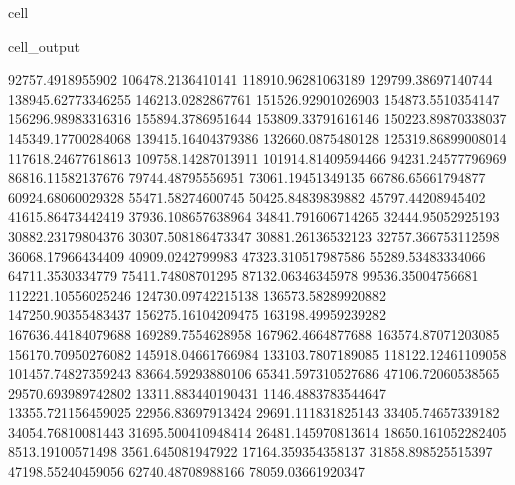 \documentclass[letterpaper,10pt,english]{jupyterBook}
\begin{document}
\begin{sphinxuseclass}{cell}
\begin{sphinxVerbatimOutput}
\begin{sphinxuseclass}{cell_output}
\begin{sphinxVerbatim}[commandchars=\\\{\}]
92757.4918955902  106478.2136410141  118910.96281063189  129799.38697140744  138945.62773346255  146213.0282867761  151526.92901026903  154873.5510354147  156296.98983316316  155894.3786951644  153809.33791616146  150223.89870338037  145349.17700284068  139415.16404379386  132660.0875480128  125319.86899008014  117618.24677618613  109758.14287013911  101914.81409594466  94231.24577796969  86816.11582137676  79744.48795556951  73061.19451349135  66786.65661794877  60924.68060029328  55471.58274600745  50425.84839839882  45797.44208945402  41615.86473442419  37936.108657638964  34841.791606714265  32444.95052925193  30882.23179804376  30307.508186473347  30881.26136532123  32757.366753112598  36068.17966434409  40909.0242799983  47323.310517987586  55289.53483334066  64711.3530334779  75411.74808701295  87132.06346345978  99536.35004756681  112221.10556025246  124730.09742215138  136573.58289920882  147250.90355483437  156275.16104209475  163198.49959239282  167636.44184079688  169289.7554628958  167962.4664877688  163574.87071203085  156170.70950276082  145918.04661766984  133103.7807189085  118122.12461109058  101457.74827359243  83664.59293880106  65341.597310527686  47106.72060538565  29570.693989742802  13311.883440190431  \PYGZhy{}1146.4883783544647  \PYGZhy{}13355.721156459025  \PYGZhy{}22956.83697913424  \PYGZhy{}29691.111831825143  \PYGZhy{}33405.74657339182  \PYGZhy{}34054.76810081443  \PYGZhy{}31695.500410948414  \PYGZhy{}26481.145970813614  \PYGZhy{}18650.161052282405  \PYGZhy{}8513.19100571498  3561.645081947922  17164.359354358137  31858.898525515397  47198.55240459056  62740.48708988166  78059.03661920347  

\end{sphinxVerbatim}
\end{sphinxuseclass}
\end{sphinxVerbatimOutput}
\end{sphinxuseclass}
\end{document}

